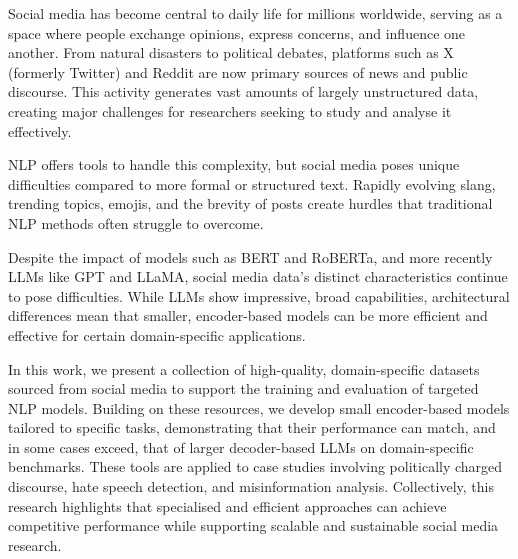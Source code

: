 Social media has become central to daily life for millions worldwide, serving as a space where people exchange opinions, express concerns, and influence one another. From natural disasters to political debates, platforms such as X (formerly Twitter) and Reddit are now primary sources of news and public discourse. This activity generates vast amounts of largely unstructured data, creating major challenges for researchers seeking to study and analyse it effectively.

\ac{NLP} offers tools to handle this complexity, but social media poses unique difficulties compared to more formal or structured text. Rapidly evolving slang, trending topics, emojis, and the brevity of posts create hurdles that traditional \ac{NLP} methods often struggle to overcome.

Despite the impact of models such as BERT and RoBERTa, and more recently \acp{LLM} like GPT and LLaMA, social media data's distinct characteristics continue to pose difficulties. While \acp{LLM} show impressive, broad capabilities, architectural differences mean that smaller, encoder-based models can be more efficient and effective for certain domain-specific applications.

In this work, we present a collection of high-quality, domain-specific datasets sourced from social media to support the training and evaluation of targeted \ac{NLP} models. Building on these resources, we develop small encoder-based models tailored to specific tasks, demonstrating that their performance can match, and in some cases exceed, that of larger decoder-based \acp{LLM} on domain-specific benchmarks. These tools are applied to case studies involving politically charged discourse, hate speech detection, and misinformation analysis. Collectively, this research highlights that specialised and efficient approaches can achieve competitive performance while supporting scalable and sustainable social media research.